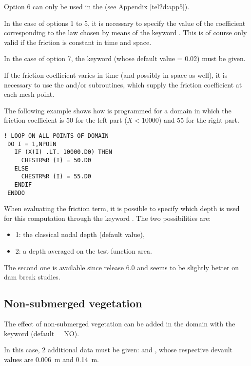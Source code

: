 Option 6 can only be used in the 
(see Appendix \ref{tel2d:app5}).

In the case of options 1 to 5, it is necessary to specify the value
of the coefficient corresponding to the law chosen by means of the keyword
.
This is of course only valid if the friction is constant in time and space.

In the case of option 7, the keyword
(whose default value = 0.02) must be given.

If the friction coefficient varies in time (and possibly in space as well),
it is necessary to use the  and/or 
subroutines, which supply the friction coefficient at each mesh point.

The following example shows how  is programmed for a
domain in which the friction coefficient is 50 for the left part ($X<10000$)
and 55 for the right part.
\begin{lstlisting}[language=TelFortran]
! LOOP ON ALL POINTS OF DOMAIN
 DO I = 1,NPOIN
   IF (X(I) .LT. 10000.D0) THEN
     CHESTR%R (I) = 50.D0
   ELSE
     CHESTR%R (I) = 55.D0
   ENDIF
 ENDDO
\end{lstlisting}
When evaluating the friction term, it is possible to specify which depth is used
for this computation through the keyword .
The two possibilities are:
\begin{itemize}
\item 1: the classical nodal depth (default value),
\item 2: a depth averaged on the test function area.
\end{itemize}
The second one is available since release 6.0 and seems to be slightly better
on dam break studies.


\subsection{Non-submerged vegetation}

The effect of non-submerged vegetation can be added in the domain
with the keyword  (default = NO).

In this case, 2 additional data must be given:
 and
,
whose respective devault values are 0.006~m and 0.14~m.

